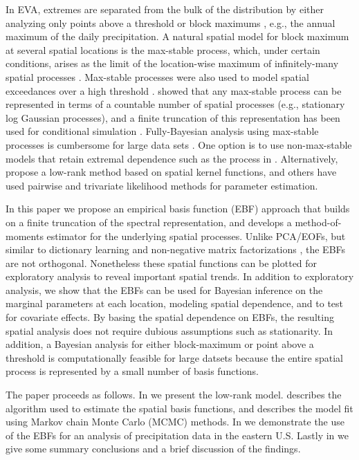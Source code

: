 \documentclass[aoas]{imsart}
\begin{document}
In EVA, extremes are separated from the bulk of the distribution by either analyzing only points above a threshold or block maximums \citep{Coles2001}, e.g., the annual maximum of the daily precipitation.
A natural spatial model for block maximum at several spatial locations is the max-stable process, which, under certain conditions, arises as the limit of the location-wise maximum of infinitely-many spatial processes \citep{deHaan2006}.
Max-stable processes were also used to model spatial exceedances over a high threshold \citep{Thibaud2013,Huser2014}.
 showed that any max-stable process can be represented in terms of a countable number of spatial processes (e.g., stationary log Gaussian processes), and a finite truncation of this representation has been used for conditional simulation \citep{Wang2011}.
Fully-Bayesian analysis using max-stable processes is cumbersome for large data sets \citep{Wadsworth2014,Thibaud2013a}.
One option is to use non-max-stable models that retain extremal dependence such as the \skewt{} process in \citep{Morris2016}.
Alternatively, \citet{Reich2012} propose a low-rank method based on spatial kernel functions, and others have used pairwise \citep{Padoan2010,Huser2014} and trivariate \citep{Genton2011} likelihood methods for parameter estimation.

In this paper we propose an empirical basis function (EBF) approach that builds on a finite truncation of the spectral representation, and develops a method-of-moments estimator for the underlying spatial processes.
Unlike PCA/EOFs, but similar to dictionary learning \citep{Mairal2014} and non-negative matrix factorizations \citep{Lee1999}, the EBFs are not orthogonal.
Nonetheless these spatial functions can be plotted for exploratory analysis to reveal important spatial trends.
In addition to exploratory analysis, we show that the EBFs can be used for Bayesian inference on the marginal parameters at each location, modeling spatial dependence, and to test for covariate effects.
By basing the spatial dependence on EBFs, the resulting spatial analysis does not require dubious assumptions such as stationarity.
In addition, a Bayesian analysis for either block-maximum or point above a threshold is computationally feasible for large datsets because the entire spatial process is represented by a small number of basis functions.

The paper proceeds as follows.
In  we present the low-rank model.  describes the algorithm used to estimate the spatial basis functions, and  describes the model fit using Markov chain Monte Carlo (MCMC) methods.
In  we demonstrate the use of the EBFs for an analysis of precipitation data in the eastern U.S. Lastly in  we give some summary conclusions and a brief discussion of the findings.
\end{document}
